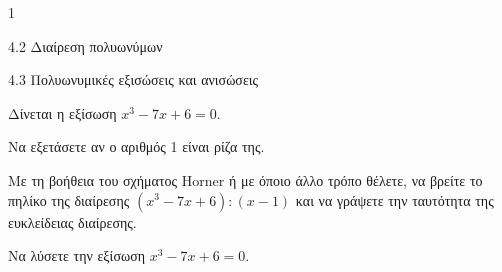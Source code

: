 \begin{ylh}{1}
\item 4.2 Διαίρεση πολυωνύμων
\item 4.3 Πολυωνυμικές εξισώσεις και ανισώσεις
\end{ylh}
Δίνεται η εξίσωση $x^3 - 7x + 6 = 0$.
\begin{alist}
\item Να εξετάσετε αν ο αριθμός 1 είναι ρίζα της.
\item Με τη βοήθεια του σχήματος Horner ή με όποιο άλλο τρόπο θέλετε, να βρείτε το πηλίκο της διαίρεσης
$(x^3 - 7x + 6) : (x - 1)$
και να γράψετε την ταυτότητα της ευκλείδειας διαίρεσης.
\item Να λύσετε την εξίσωση $x^3 - 7x + 6 = 0$.
\end{alist}

